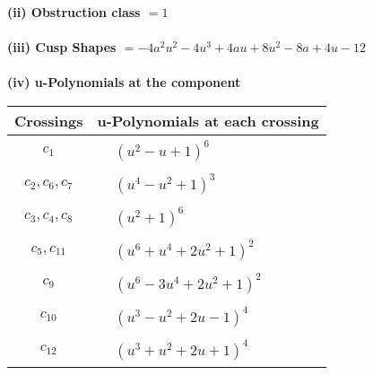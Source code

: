 \documentclass[1p]{elsarticle_modified}
\theoremstyle{definition}
\begin{document}
\flushleft \textbf{(ii) Obstruction class $= 1$}\\~\\
\flushleft \textbf{(iii) Cusp Shapes $= -4 a^2 u^2-4 u^3+4 a u+8 u^2-8 a+4 u-12$}\\~\\
\newpage\renewcommand{\arraystretch}{1}
\flushleft \textbf{(iv) u-Polynomials at the component}\newline \\
\begin{tabular}{m{50pt}|m{274pt}}
Crossings & \hspace{64pt}u-Polynomials at each crossing \\
\hline $$\begin{aligned}c_{1}\end{aligned}$$&$\begin{aligned}
&(u^2- u+1)^6
\end{aligned}$\\
\hline $$\begin{aligned}c_{2},c_{6},c_{7}\end{aligned}$$&$\begin{aligned}
&(u^4- u^2+1)^3
\end{aligned}$\\
\hline $$\begin{aligned}c_{3},c_{4},c_{8}\end{aligned}$$&$\begin{aligned}
&(u^2+1)^6
\end{aligned}$\\
\hline $$\begin{aligned}c_{5},c_{11}\end{aligned}$$&$\begin{aligned}
&(u^6+u^4+2 u^2+1)^2
\end{aligned}$\\
\hline $$\begin{aligned}c_{9}\end{aligned}$$&$\begin{aligned}
&(u^6-3 u^4+2 u^2+1)^2
\end{aligned}$\\
\hline $$\begin{aligned}c_{10}\end{aligned}$$&$\begin{aligned}
&(u^3- u^2+2 u-1)^4
\end{aligned}$\\
\hline $$\begin{aligned}c_{12}\end{aligned}$$&$\begin{aligned}
&(u^3+u^2+2 u+1)^4
\end{aligned}$\\
\hline
\end{tabular}\\~\\
\end{document}
